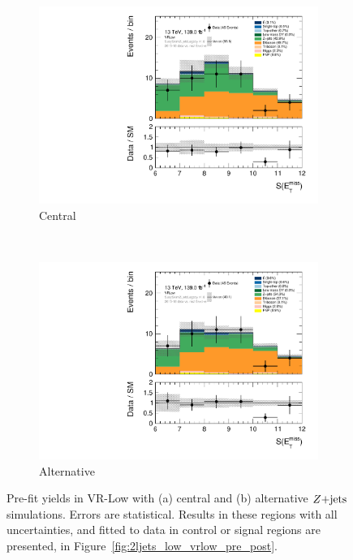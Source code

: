 \begin{figure}[tp]
\centering
\begin{subfigure}{0.62\textwidth}
\centering
\includegraphics[width=\textwidth]{figures/2ljets_vrlow_met_Sign_VRLow.pdf}
\caption{Central}
\end{subfigure}
\\
\begin{subfigure}{0.62\textwidth}
\centering
\includegraphics[width=\textwidth]{figures/2ljets_vrlow_met_Sign_VRLow_mg5.pdf}
\caption{Alternative}
\end{subfigure}
\caption[
Pre-fit yields in VR-Low with central and alternative $\zjets$ simulations
]{%
Pre-fit yields in VR-Low with (a) central and (b) alternative $\zjets$
simulations.
Errors are statistical.
Results in these regions with all uncertainties, and fitted to data in
control or signal regions are presented, in
Figure~\ref{fig:2ljets_low_vrlow_pre_post}.
}
\label{fig:2ljets_vrlow_alt}
\end{figure}

